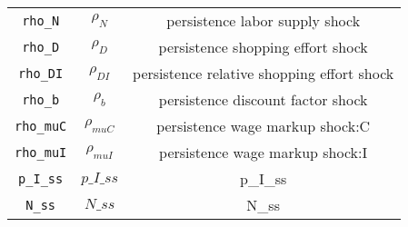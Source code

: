 \begin{center}
\begin{longtable}{ccc}
\texttt{rho\_N} & ${\rho_N}$ & persistence labor supply shock\\
\texttt{rho\_D} & ${\rho_D}$ & persistence shopping effort shock\\
\texttt{rho\_DI} & ${\rho_{DI}}$ & persistence relative shopping effort shock\\
\texttt{rho\_b} & ${\rho_b}$ & persistence discount factor shock\\
\texttt{rho\_muC} & ${\rho_{muC}}$ & persistence wage markup shock:C\\
\texttt{rho\_muI} & ${\rho_{muI}}$ & persistence wage markup shock:I\\
\texttt{p\_I\_ss} & $p\_I\_ss$ & p\_I\_ss\\
\texttt{N\_ss} & $N\_ss$ & N\_ss\\
\hline%
\end{longtable}
\end{center}
